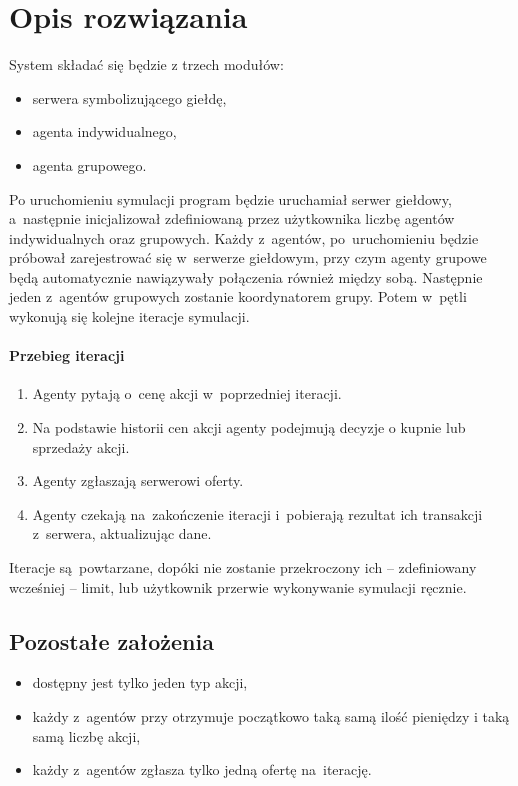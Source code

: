 \documentclass[11pt,a4paper]{article}
\begin{document}
\section{Opis rozwiązania}
System składać się będzie z trzech modułów:
\begin{itemize}
  \item serwera symbolizującego giełdę,
  \item agenta indywidualnego,
  \item agenta grupowego.
\end{itemize}

Po uruchomieniu symulacji program będzie uruchamiał serwer giełdowy, a~następnie inicjalizował zdefiniowaną przez użytkownika liczbę agentów indywidualnych oraz grupowych. Każdy z~agentów, po~uruchomieniu będzie próbował zarejestrować się w~serwerze giełdowym, przy czym agenty grupowe będą automatycznie nawiązywały połączenia również między sobą. Następnie jeden z~agentów grupowych zostanie koordynatorem grupy. Potem w~pętli wykonują się kolejne iteracje symulacji.

\paragraph{Przebieg iteracji}
\begin{enumerate}
  \item Agenty pytają o~cenę akcji w~poprzedniej iteracji.
  \item Na podstawie historii cen akcji agenty podejmują decyzje o kupnie lub sprzedaży akcji.
  \item Agenty zgłaszają serwerowi oferty.
  \item Agenty czekają na~zakończenie iteracji i~pobierają rezultat ich transakcji z~serwera, aktualizując dane.
\end{enumerate}

Iteracje są~powtarzane, dopóki nie zostanie przekroczony ich -- zdefiniowany wcześniej -- limit, lub użytkownik przerwie wykonywanie symulacji ręcznie.

\newpage
\subsection{Pozostałe założenia}
\begin{itemize}
  \item dostępny jest tylko jeden typ akcji,
  \item każdy z~agentów przy otrzymuje początkowo taką samą ilość pieniędzy i taką samą liczbę akcji,
  \item każdy z~agentów zgłasza tylko jedną ofertę na~iterację.
\end{itemize}
\end{document}
